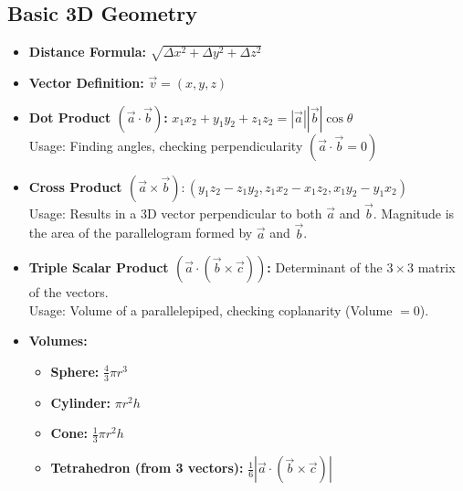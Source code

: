\subsection{Basic 3D Geometry}

\begin{itemize}
    \item \textbf{Distance Formula: }$\sqrt{\Delta x^2 + \Delta y^2 + \Delta z^2}$
    \item \textbf{Vector Definition: }$\vec{v} = (x,y,z)$
    \item \textbf{Dot Product $(\vec{a} \cdot \vec{b})$: }$x_1 x_2 + y_1 y_2 + z_1 z_2 = |\vec{a}| |\vec{b}| \cos \theta$ \\ Usage: Finding angles, checking perpendicularity $(\vec{a} \cdot \vec{b} = 0)$
    \item \textbf{Cross Product $(\vec{a} \times \vec{b}): $}$(y_1 z_2 - z_1 y_2, z_1 x_2 - x_1 z_2, x_1 y_2 - y_1 x_2)$ \\ Usage: Results in a 3D vector perpendicular to both $\vec{a}$ and $\vec{b}$. Magnitude is the area of the parallelogram formed by $\vec{a}$ and $\vec{b}$.
    \item \textbf{Triple Scalar Product $(\vec{a} \cdot (\vec{b} \times \vec{c}))$: } Determinant of the $3 \times 3$ matrix of the vectors. \\ Usage: Volume of a parallelepiped, checking coplanarity (Volume $= 0$).
    \item \textbf{Volumes:}
    \begin{itemize}
        \item \textbf{Sphere: } $\frac{4}{3} \pi r^3$
        \item \textbf{Cylinder: } $\pi r^2 h$
        \item \textbf{Cone: } $\frac{1}{3} \pi r^2 h$
        \item \textbf{Tetrahedron (from 3 vectors): } $\frac{1}{6} |\vec{a} \cdot (\vec{b} \times \vec{c})|$
    \end{itemize}
\end{itemize}